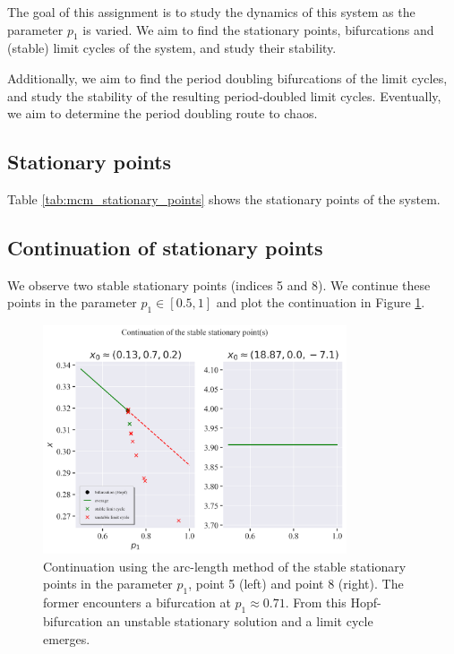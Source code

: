 The goal of this assignment is to study the dynamics of this system as the parameter $p_1$ is varied.
We aim to find the stationary points, bifurcations and (stable) limit cycles of the system, and study their stability.

Additionally, we aim to find the period doubling bifurcations of the limit cycles, and study the stability of the resulting
period-doubled limit cycles. Eventually, we aim to determine the period doubling route to chaos.

\subsection{Stationary points}
Table \ref{tab:mcm_stationary_points} shows the stationary points of the system. 


\subsection{Continuation of stationary points}
We observe two stable stationary points (indices 5 and 8). We continue these
points in the parameter $ p_1 \in [0.5, 1] $ and plot the continuation in Figure \ref{fig:mcm_continuation}.
\begin{figure}[H]
    \centering
    \includegraphics[width=0.8\textwidth]{figures/mcm_continuation.png}
    \caption{Continuation using the arc-length method of the stable stationary points in the parameter $p_1$,
    point 5 (left) and point 8 (right). The former encounters a bifurcation at $p_1 \approx 0.71$. From this 
    Hopf-bifurcation an unstable stationary solution and a limit cycle emerges.}
    \label{fig:mcm_continuation}
\end{figure}

